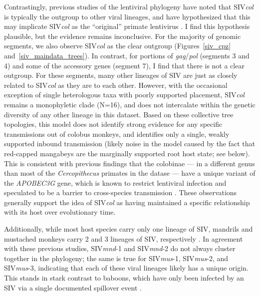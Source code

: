 Contrastingly, previous studies of the lentiviral phylogeny have noted that SIV\textit{col} is typically the outgroup to other viral lineages, and have hypothesized that this may implicate SIV\textit{col} as the “original” primate lentivirus \citep{compton2013convergence}.
I find this hypothesis plausible, but the evidence remains inconclusive.
For the majority of genomic segments, we also observe SIV\textit{col} as the clear outgroup (Figures~\ref{siv_cpz} and~\ref{siv_maindata_trees}).
In contrast, for portions of \textit{gag}/\textit{pol} (segments 3 and 4) and some of the accessory genes (segment 7), I find that there is not a clear outgroup.
For these segments, many other lineages of SIV are just as closely related to SIV\textit{col} as they are to each other.
However, with the occasional exception of single heterologous taxa with poorly supported placement, SIV\textit{col} remains a monophyletic clade (N=16), and does not intercalate within the genetic diversity of any other lineage in this dataset.
Based on these collective tree topologies, this model does not identify strong evidence for any specific transmissions out of colobus monkeys, and identifies only a single, weakly supported inbound transmission (likely noise in the model caused by the fact that red-capped mangabeys are the marginally supported root host state; see below).
This is consistent with previous findings that the colobinae --- in a different genus than most of the \textit{Cercopithecus} primates in the datase --- have a unique variant of the \textit{APOBEC3G} gene, which is known to restrict lentiviral infection and speculated to be a barrier to cross-species transmission \citep{compton2013convergence}.
These observations generally support the idea of SIV\textit{col} as having maintained a specific relationship with its host over evolutionary time.

Additionally, while most host species carry only one lineage of SIV, mandrils and mustached monkeys carry 2 and 3 lineages of SIV, respectively \citep{aghokeng2007full,courgnaud2003identification,liegeois2012new,souquiere2001wild}.
In agreement with these previous studies, SIV\textit{mnd}-1 and SIV\textit{mnd}-2 do not always cluster together in the phylogeny; the same is true for SIV\textit{mus}-1, SIV\textit{mus}-2, and SIV\textit{mus}-3, indicating that each of these viral lineages likely has a unique origin.
This stands in stark contrast to baboons, which have only been infected by an SIV via a single documented spillover event \citep{jin1994infection}.

